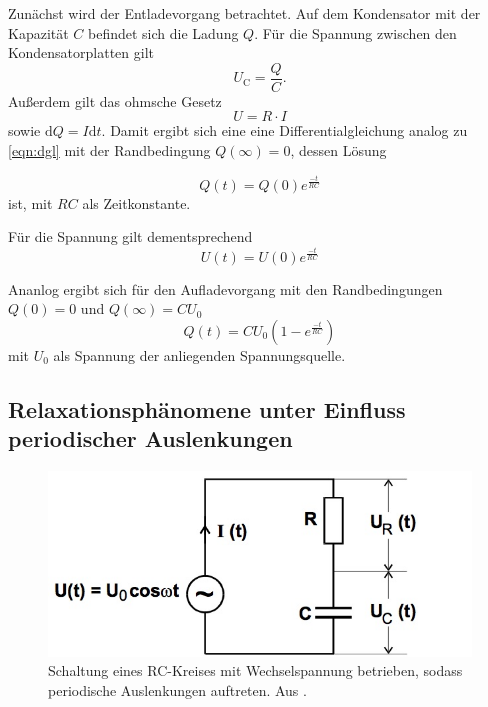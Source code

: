 Zunächst wird der Entladevorgang betrachtet. Auf dem Kondensator mit der Kapazität $C$ befindet sich die Ladung $Q$. Für die Spannung zwischen den Kondensatorplatten gilt
\begin{equation}
  U_{\mathrm C} = \frac{Q}{C} .
\end{equation}
Außerdem gilt das ohmsche Gesetz
\begin{equation}
  U = R \cdot I
\end{equation}
sowie $\mathrm{d}Q = I \mathrm{d}t$.  Damit ergibt sich eine eine Differentialgleichung analog zu \ref{eqn:dgl} mit der Randbedingung $Q(\infty)  = 0$, dessen Lösung

\begin{equation}
  Q(t) = Q(0) e^{\frac{-t}{RC}}
\end{equation}
ist, mit $RC$ als Zeitkonstante.

Für die Spannung gilt dementsprechend
\begin{equation}
  U(t) = U(0) e^{\frac{-t}{RC}}
\end{equation}

Ananlog ergibt sich für den Aufladevorgang mit den Randbedingungen $Q(0) = 0$ und $Q(\infty) = CU_0$
\begin{equation}
  Q(t) = CU_0(1 - e^{\frac{-t}{RC}})
\end{equation}
mit $U_0$ als Spannung der anliegenden Spannungsquelle.

\subsection{Relaxationsphänomene unter Einfluss periodischer Auslenkungen}

\begin{figure}
  \centering
  \includegraphics[scale=0.5]{content/RC-periodisch.jpg}
  \caption{Schaltung eines RC-Kreises mit Wechselspannung betrieben, sodass periodische Auslenkungen auftreten. Aus \cite{anleitung353}.}
  \label{fig:rc-periodisch}
\end{figure}

